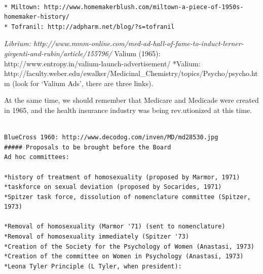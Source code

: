 \begin{adjustwidth}{2.5em}{2.5em}
\begin{verbatim}

* Miltown: http://www.homemakerblush.com/miltown-a-piece-of-1950s-homemaker-history/
* Tofranil: http://adpharm.net/blog/?s=tofranil

\end{verbatim}
\end{adjustwidth}

\emph{Librium: http:\slash \slash www.mmm-online.com\slash med-ad-hall-of-fame-to-induct-lerner-girgenti-and-rubin\slash article\slash 155796\slash 
} Valium (1965): http:\slash \slash www.entropy.in\slash valium-launch-advertisement\slash 
*Valium: http:\slash \slash faculty.weber.edu\slash ewalker\slash Medicinal\_Chemistry\slash topics\slash Psycho\slash psycho.htm (look for `Valium Ads', there are three links).

At the same time, we should remember that Medicare and Medicade were created in 1965, and the health insurance industry was being rev.utionized at this time. 

\begin{adjustwidth}{2.5em}{2.5em}
\begin{verbatim}

BlueCross 1960: http://www.decodog.com/inven/MD/md28530.jpg 
##### Proposals to be brought before the Board
Ad hoc committees: 

*history of treatment of homosexuality (proposed by Marmor, 1971)
*taskforce on sexual deviation (proposed by Socarides, 1971)
*Spitzer task force, dissolution of nomenclature committee (Spitzer, 1973)

*Removal of homosexuality (Marmor '71) (sent to nomenclature)
*Removal of homosexuality immediately (Spitzer '73)
*Creation of the Society for the Psychology of Women (Anastasi, 1973)
*Creation of the committee on Women in Psychology (Anastasi, 1973)
*Leona Tyler Principle (L Tyler, when president):

\end{verbatim}
\end{adjustwidth}

